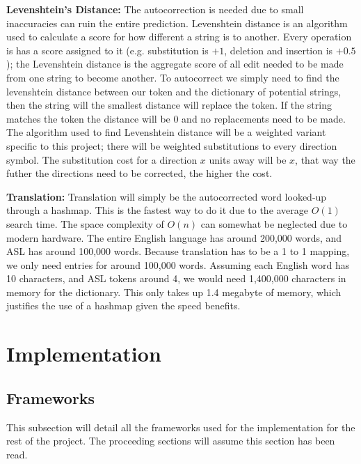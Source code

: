\documentclass[11pt]{article}
\def\paraskip{\vskip 0.4cm}
\begin{document}
        \paraskip

        \noindent\textbf{Levenshtein's Distance: } The autocorrection is needed due to small inaccuracies can ruin the entire prediction. Levenshtein distance is an algorithm used to calculate a score for how different a string is to another. Every operation is has a score assigned to it (e.g. substitution is $+1$, deletion and insertion is $+0.5$); the Levenshtein distance is the aggregate score of all edit needed to be made from one string to become another. To autocorrect we simply need to find the levenshtein distance between our token and the dictionary of potential strings, then the string will the smallest distance will replace the token. If the string matches the token the distance will be 0 and no replacements need to be made. The algorithm used to find Levenshtein distance will be a weighted variant specific to this project; there will be weighted substitutions to every direction symbol. The substitution cost for a direction $x$ units away will be $x$, that way the futher the directions need to be corrected, the higher the cost.

        \paraskip

        \noindent\textbf{Translation: } Translation will simply be the autocorrected word looked-up through a hashmap. This is the fastest way to do it due to the average $O(1)$ search time. The space complexity of $O(n)$ can somewhat be neglected due to modern hardware. The entire English language has around 200,000 words, and ASL has around 100,000 words. Because translation has to be a 1 to 1 mapping, we only need entries for around 100,000 words. Assuming each English word has 10 characters, and ASL tokens around 4, we would need 1,400,000 characters in memory for the dictionary. This only takes up 1.4 megabyte of memory, which justifies the use of a hashmap given the speed benefits.
        

\section{Implementation}
    \subsection{Frameworks}
    This subsection will detail all the frameworks used for the implementation for the rest of the project. The proceeding sections will assume this section has been read.
\end{document}
